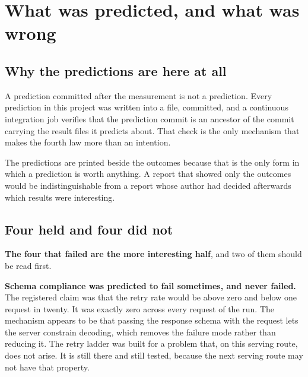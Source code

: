 \chapter{What was predicted, and what was wrong}
\label{ch:predictions}

\section{Why the predictions are here at all}

A prediction committed after the measurement is not a prediction. Every
prediction in this project was written into a file, committed, and a continuous
integration job verifies that the prediction commit is an ancestor of the commit
carrying the result files it predicts about. That check is the only mechanism
that makes the fourth law more than an intention.

The predictions are printed beside the outcomes because that is the only form in
which a prediction is worth anything. A report that showed only the outcomes
would be indistinguishable from a report whose author had decided afterwards
which results were interesting.

\begin{table}[htbp]
  \centering
  \caption{The eight claims registered before the benchmark ran, the number that
  settled each one, and the outcome. The measured column is read from the result
  files by the table generator, so a prediction cannot be scored generously by
  whoever writes the report.}
  \label{tab:predictions}
  
\end{table}

\section{Four held and four did not}

\textbf{The four that failed are the more interesting half}, and two of them
should be read first.

\textbf{Schema compliance was predicted to fail sometimes, and never failed.}
The registered claim was that the retry rate would be above zero and below one
request in twenty. It was exactly zero across every request of the run. The
mechanism appears to be that passing the response schema with the request lets
the server constrain decoding, which removes the failure mode rather than
reducing it. The retry ladder was built for a problem that, on this serving
route, does not arise. It is still there and still tested, because the next
serving route may not have that property.

